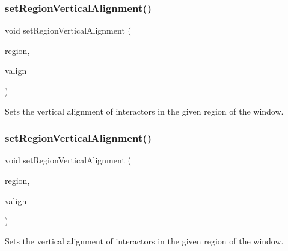\mbox{\label{classGWindow_afbe22d897ce8ef25db52cbc3d456aa0a}} 
\subsubsection{\texorpdfstring{set\+Region\+Vertical\+Alignment()}{setRegionVerticalAlignment()}\hspace{0.1cm}{\footnotesize\ttfamily [1/2]}}
{\footnotesize\ttfamily void set\+Region\+Vertical\+Alignment (\begin{DoxyParamCaption}\item[{const std\+::string \&}]{region,  }\item[{const std\+::string \&}]{valign }\end{DoxyParamCaption})\hspace{0.3cm}{\ttfamily [virtual]}}



Sets the vertical alignment of interactors in the given region of the window. 

\mbox{\label{classGWindow_a1efb2d3b67fb479aad27a6c0032ee70e}} 
\subsubsection{\texorpdfstring{set\+Region\+Vertical\+Alignment()}{setRegionVerticalAlignment()}\hspace{0.1cm}{\footnotesize\ttfamily [2/2]}}
{\footnotesize\ttfamily void set\+Region\+Vertical\+Alignment (\begin{DoxyParamCaption}\item[{\mbox{\hyperlink{classGWindow_a81a01a86de31071a92e6cce0bab9bc4b}{Region}}}]{region,  }\item[{Vertical\+Alignment}]{valign }\end{DoxyParamCaption})\hspace{0.3cm}{\ttfamily [virtual]}}



Sets the vertical alignment of interactors in the given region of the window. 

